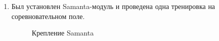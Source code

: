 \begin{enumerate}
	\item Был установлен Samanta-модуль и проведена одна тренировка на соревновательном поле.
	
	\begin{figure}[H]
		\begin{minipage}[h]{1\linewidth}
		\end{minipage}
		\caption{Крепление Samanta}
	\end{figure}
	 	
\end{enumerate}
\fillpage